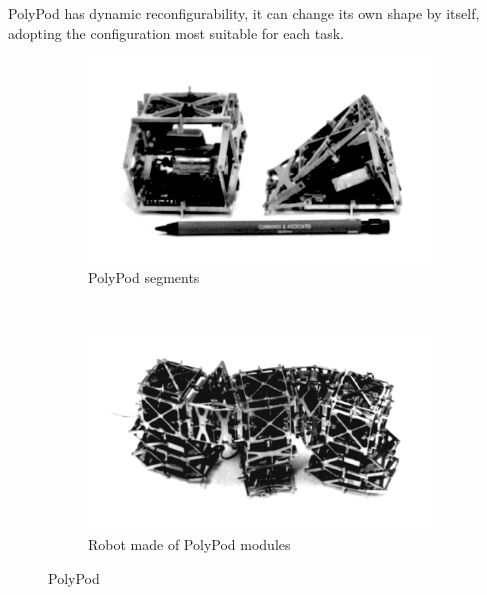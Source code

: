 PolyPod has dynamic reconfigurability, it can change its own shape by itself, adopting the configuration most suitable for each task.\\

\begin{figure}[h]
        \centering
        \begin{subfigure}[b]{0.3\textwidth}
                \centering
                \includegraphics[width=\textwidth]{images/State_art_PolyPod.png}
                \caption{PolyPod segments}
                \label{fig:state_art_polypod-01}
        \end{subfigure}%
        ~ 
        \begin{subfigure}[b]{0.3\textwidth}
                \centering
               	\includegraphics[width=\textwidth]{images/State_art_PolyPod-2.png}
                \caption{Robot made of PolyPod modules}
                \label{fig:state_art_polypod-02}
        \end{subfigure}
        \caption{PolyPod}
        \label{fig:state_art_polypod}
\end{figure}
